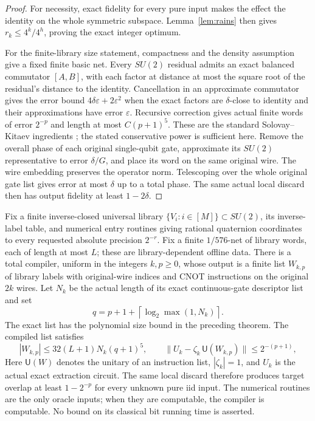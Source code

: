 \begin{proof}
For necessity, exact fidelity for every pure input makes the effect the identity on the whole symmetric subspace. Lemma~\ref{lem:rains} then gives $r_k\le4^k/4^h$, proving the exact integer optimum.

For the finite-library size statement, compactness and the density assumption give a fixed finite basic net. Every $SU(2)$ residual admits an exact balanced commutator $[A,B]$, with each factor at distance at most the square root of the residual's distance to the identity. Cancellation in an approximate commutator gives the error bound $4\delta\varepsilon+2\varepsilon^2$ when the exact factors are $\delta$-close to identity and their approximations have error $\varepsilon$. Recursive correction gives actual finite words of error $2^{-p}$ and length at most $C(p+1)^5$. These are the standard Solovay--Kitaev ingredients \cite{dawson}; the stated conservative power is sufficient here. Remove the overall phase of each original single-qubit gate, approximate its $SU(2)$ representative to error $\delta/G$, and place its word on the same original wire. The wire embedding preserves the operator norm. Telescoping over the whole original gate list gives error at most $\delta$ up to a total phase. The same actual local discard then has output fidelity at least $1-2\delta$.

\end{proof}

\begin{proposition}\label{prop:effective-compiler}
Fix a finite inverse-closed universal library $\{V_i:i\in[M]\}\subset SU(2)$, its inverse-label table, and numerical entry routines giving rational quaternion coordinates to every requested absolute precision $2^{-r}$. Fix a finite $1/576$-net of library words, each of length at most $L$; these are library-dependent offline data. There is a total compiler, uniform in the integers $k,p\ge0$, whose output is a finite list $W_{k,p}$ of library labels with original-wire indices and CNOT instructions on the original $2k$ wires. Let $N_k$ be the actual length of its exact continuous-gate descriptor list and set
\[
 q=p+1+\left\lceil\log_2\max(1,N_k)\right\rceil.
\]
The exact list has the polynomial size bound in the preceding theorem. The compiled list satisfies
\[
 |W_{k,p}|\le32(L+1)N_k(q+1)^5,
 \qquad \|U_k-\zeta_k\,\mathsf U(W_{k,p})\|\le2^{-(p+1)},
\]
Here $\mathsf U(W)$ denotes the unitary of an instruction list, $|\zeta_k|=1$, and $U_k$ is the actual exact extraction circuit. The same local discard therefore produces target overlap at least $1-2^{-p}$ for every unknown pure iid input. The numerical routines are the only oracle inputs; when they are computable, the compiler is computable. No bound on its classical bit running time is asserted.
\end{proposition}

